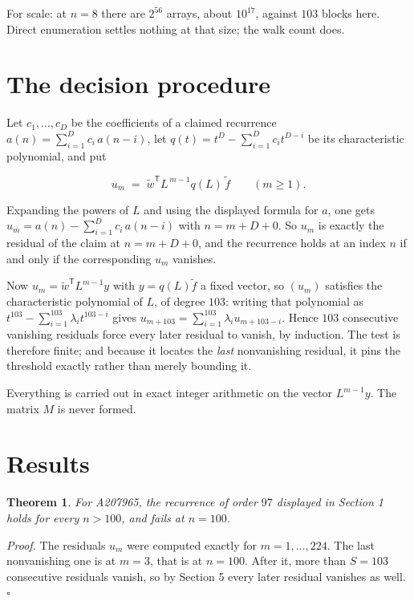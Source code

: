 \documentclass[11pt]{article}
\newtheorem{theorem}{Theorem}
\theoremstyle{definition}
\begin{document}
For scale: at $n = 8$ there are $2^{56}$ arrays, about $10^{17}$, against $103$ blocks here. Direct enumeration settles nothing at that size; the walk count does.

\section{The decision procedure}

Let $c_1,\dots,c_D$ be the coefficients of a claimed recurrence $a(n) = \sum_{i=1}^{D} c_i\,a(n-i)$, let $q(t) = t^{D} - \sum_{i=1}^{D} c_i t^{D-i}$ be its characteristic polynomial, and put

\[u_m \;=\; \tilde w^{\mathsf T} L^{\,m-1} q(L)\,\tilde f \qquad (m \ge 1).\]

Expanding the powers of $L$ and using the displayed formula for $a$, one gets $u_m = a(n) - \sum_{i=1}^{D} c_i\,a(n-i)$ with $n = m + D + 0$. So $u_m$ is exactly the residual of the claim at $n = m + D + 0$, and the recurrence holds at an index $n$ if and only if the corresponding $u_m$ vanishes.

Now $u_m = \tilde w^{\mathsf T} L^{m-1} y$ with $y = q(L)\tilde f$ a fixed vector, so $(u_m)$ satisfies the characteristic polynomial of $L$, of degree $103$: writing that polynomial as $t^{103} - \sum_{i=1}^{103} \lambda_i t^{103-i}$ gives $u_{m+103} = \sum_{i=1}^{103} \lambda_i u_{m+103-i}$. Hence $103$ consecutive vanishing residuals force every later residual to vanish, by induction. The test is therefore finite; and because it locates the {\itshape last} nonvanishing residual, it pins the threshold exactly rather than merely bounding it.

Everything is carried out in exact integer arithmetic on the vector $L^{m-1}y$. The matrix $M$ is never formed.

\section{Results}

\begin{theorem} For A207965, the recurrence of order $97$ displayed in Section 1 holds for every $n > 100$, and fails at $n = 100$.\end{theorem}

{\itshape Proof.} The residuals $u_m$ were computed exactly for $m = 1,\dots,224$. The last nonvanishing one is at $m = 3$, that is at $n = 100$. After it, more than $S = 103$ consecutive residuals vanish, so by Section 5 every later residual vanishes as well. $\square$
\end{document}
